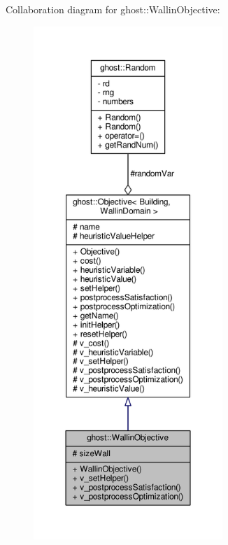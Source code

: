 Collaboration diagram for ghost\-:\-:Wallin\-Objective\-:
\nopagebreak
\begin{figure}[H]
\begin{center}
\leavevmode
\includegraphics[height=550pt]{classghost_1_1WallinObjective__coll__graph}
\end{center}
\end{figure}
